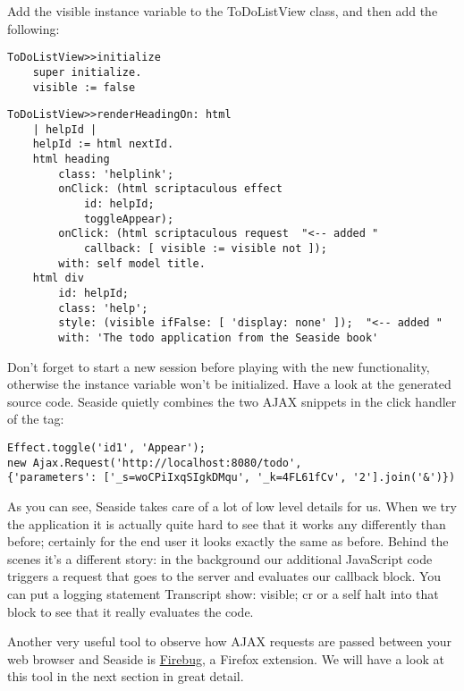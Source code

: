 \documentclass[a4paper,10pt,twoside]{book}
\newcommand{\ct}[1]{{\small\ttfamily\textup{#1}}}
\begin{document}
Add the \ct{visible} instance variable to the \ct{ToDoListView} class, and then add the following:

\begin{lstlisting}
ToDoListView>>initialize
    super initialize.
    visible := false
\end{lstlisting}

\begin{lstlisting}
ToDoListView>>renderHeadingOn: html
    | helpId |
    helpId := html nextId.
    html heading
        class: 'helplink';
        onClick: (html scriptaculous effect
            id: helpId;
            toggleAppear);
        onClick: (html scriptaculous request  "<-- added "
            callback: [ visible := visible not ]);
        with: self model title.
    html div
        id: helpId;
        class: 'help';
        style: (visible ifFalse: [ 'display: none' ]);  "<-- added "
        with: 'The todo application from the Seaside book'
\end{lstlisting}

Don't forget to start a new session before playing with the new functionality, otherwise the instance variable won't be initialized. Have a look at the generated source code. Seaside quietly combines the two AJAX snippets in the click handler of the tag:

\begin{lstlisting}
Effect.toggle('id1', 'Appear'); 
new Ajax.Request('http://localhost:8080/todo', 
{'parameters': ['_s=woCPiIxqSIgkDMqu', '_k=4FL61fCv', '2'].join('&')})
\end{lstlisting}

As you can see, Seaside takes care of a lot of low level details for us. When we try the application it is actually quite hard to see that it works any differently than before; certainly for the end user it looks exactly the same as before. Behind the scenes it's a different story: in the background our additional JavaScript code triggers a request that goes to the server and evaluates our callback block. You can put a logging statement \ct{Transcript show: visible; cr} or a \ct{self halt} into that block to see that it really evaluates the code. 

Another very useful tool to observe how AJAX requests are passed between your web browser and Seaside is \href{http://www.getfirebug.com}{Firebug}, a Firefox extension. We will have a look at this tool in the next section in great detail.
\end{document}
